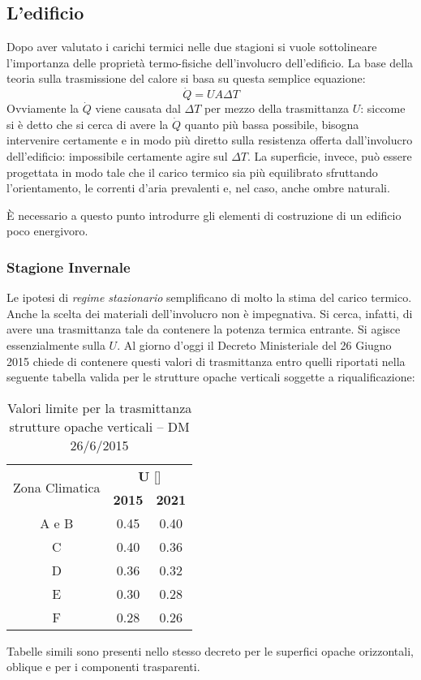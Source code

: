 \subsection{L'edificio}
Dopo aver valutato i carichi termici nelle due stagioni si vuole sottolineare l'importanza delle proprietà termo-fisiche dell'involucro dell'edificio.
La base della teoria sulla trasmissione del calore si basa su questa semplice equazione:
\begin{equation}
	\dot{Q}=UA\Delta T
\end{equation}
Ovviamente la $\dot{Q}$ viene causata dal $\Delta T$ per mezzo della trasmittanza $U$: siccome si è detto che si cerca di avere la $\dot{Q}$ quanto più bassa possibile, bisogna intervenire certamente e in modo più diretto sulla resistenza offerta dall'involucro dell'edificio: impossibile certamente agire sul $\Delta T$. La superficie, invece, può essere progettata in modo tale che il carico termico sia più equilibrato sfruttando l'orientamento, le correnti d'aria prevalenti e, nel caso, anche ombre naturali.

È necessario a questo punto introdurre gli elementi di costruzione di un edificio poco energivoro.

\subsubsection{Stagione Invernale}
Le ipotesi di \emph{regime stazionario} semplificano di molto la stima del carico termico. Anche la scelta dei materiali dell'involucro non è impegnativa. Si cerca, infatti, di avere una trasmittanza tale da contenere la potenza termica entrante. Si agisce essenzialmente sulla $U$. Al giorno d'oggi il Decreto Ministeriale del 26 Giugno 2015 chiede di contenere questi valori di trasmittanza entro quelli riportati nella seguente tabella valida per le strutture opache verticali soggette a riqualificazione:
\begin{table}
	\centering
	\caption{Valori limite per la trasmittanza strutture opache verticali -- DM 26/6/2015}\label{vallim}
	\begin{tabular}{ccc}
		\multirow{2}{*}{Zona Climatica} & \multicolumn{2}{c}{\textbf{U} [\trasm]}	\\
		\cmidrule(lr){2-3}
										& \textbf{2015} & \textbf{2021}				\\
		\midrule
		A e B							&	0.45		&	0.40 					\\
		C								& 	0.40		&	0.36					\\
		D								&	0.36		&	0.32					\\
		E								&	0.30		&	0.28					\\
		F								&	0.28		&	0.26					\\
	\end{tabular}
\end{table}
Tabelle simili sono presenti nello stesso decreto per le superfici opache orizzontali, oblique e per i componenti trasparenti.

